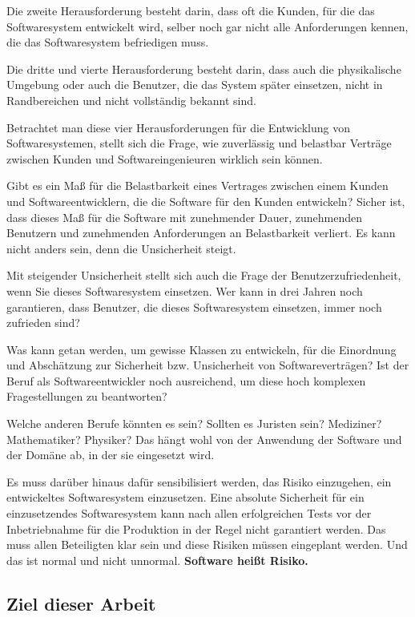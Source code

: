﻿\documentclass[a4paper,12pt]{article}
\theoremstyle{definition}
\begin{document}
Die zweite Herausforderung besteht darin, dass oft die Kunden, f\"ur die das Softwaresystem
entwickelt wird, selber noch gar nicht alle Anforderungen kennen, die das Softwaresystem
befriedigen muss.

Die dritte und vierte Herausforderung besteht darin, dass auch die physikalische Umgebung
oder auch die Benutzer, die das System sp\"ater einsetzen, nicht in Randbereichen und nicht
vollst\"andig bekannt sind.

Betrachtet man diese vier Herausforderungen f\"ur die Entwicklung von Softwaresystemen,
stellt sich die Frage, wie zuverl\"assig und belastbar Vertr\"age zwischen Kunden und
Softwareingenieuren wirklich sein k\"onnen.

Gibt es ein Ma\ss{} f\"ur die Belastbarkeit eines Vertrages zwischen einem Kunden und
Softwareentwicklern, die die Software f\"ur den Kunden entwickeln? Sicher ist, dass dieses
Ma\ss{} f\"ur die Software mit zunehmender Dauer, zunehmenden Benutzern und zunehmenden
Anforderungen an Belastbarkeit verliert. Es kann nicht anders sein, denn die Unsicherheit
steigt.

Mit steigender Unsicherheit stellt sich auch die Frage der Benutzerzufriedenheit, wenn Sie
dieses Softwaresystem einsetzen. Wer kann in drei Jahren noch garantieren, dass Benutzer,
die dieses Softwaresystem einsetzen, immer noch zufrieden sind?

Was kann getan werden, um gewisse Klassen zu entwickeln, f\"ur die Einordnung und
Absch\"atzung zur Sicherheit bzw. Unsicherheit von Softwarevertr\"agen? Ist der Beruf als
Softwareentwickler noch ausreichend, um diese hoch komplexen Fragestellungen zu beantworten?

Welche anderen Berufe k\"onnten es sein? Sollten es Juristen sein? Mediziner? Mathematiker?
Physiker? Das h\"angt wohl von der Anwendung der Software und der Dom\"ane ab, in der sie
eingesetzt wird.

Es muss dar\"uber hinaus daf\"ur sensibilisiert werden, das Risiko einzugehen, ein entwickeltes
Softwaresystem einzusetzen. Eine absolute Sicherheit f\"ur ein einzusetzendes Softwaresystem
kann nach allen erfolgreichen Tests vor der Inbetriebnahme f\"ur die Produktion in der Regel
nicht garantiert werden. Das muss allen Beteiligten klar sein und diese Risiken m\"ussen
eingeplant werden. Und das ist normal und nicht unnormal. \textbf{Software hei\ss{}t Risiko.}

\subsection{Ziel dieser Arbeit}
\end{document}
